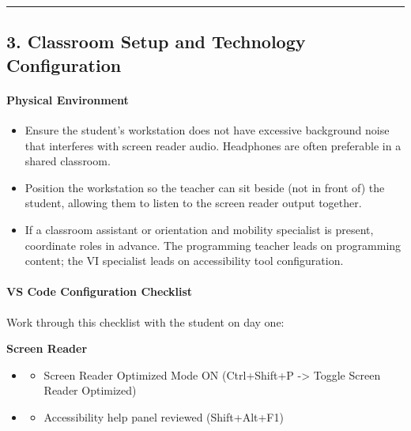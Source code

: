 \documentclass[
  justified,
  openright,
]{tufte-book}
\let\subsubsection\paragraph
\let\paragraph\paragraph
\let\subsubsection\paragraph
\let\paragraph\paragraph
\providecommand{\tightlist}{%
  \setlength{\itemsep}{0pt}\setlength{\parskip}{0pt}}
\begin{document}
\begin{center}\rule{0.5\linewidth}{0.5pt}\end{center}

\subsection{3. Classroom Setup and Technology
Configuration}\label{classroom-setup-and-technology-configuration}

\subsubsection{Physical Environment}\label{physical-environment}

\begin{itemize}
\tightlist
\item
  Ensure the student's workstation does not have excessive background
  noise that interferes with screen reader audio. Headphones are often
  preferable in a shared classroom.
\item
  Position the workstation so the teacher can sit beside (not in front
  of) the student, allowing them to listen to the screen reader output
  together.
\item
  If a classroom assistant or orientation and mobility specialist is
  present, coordinate roles in advance. The programming teacher leads on
  programming content; the VI specialist leads on accessibility tool
  configuration.
\end{itemize}

\subsubsection{VS Code Configuration
Checklist}\label{vs-code-configuration-checklist}

Work through this checklist with the student on day one:

\textbf{Screen Reader}

\begin{itemize}
\tightlist
\item
  \begin{itemize}
  \tightlist
  \item[$\square$]
    Screen Reader Optimized Mode ON (Ctrl+Shift+P -\textgreater{} Toggle
    Screen Reader Optimized)
  \end{itemize}
\item
  \begin{itemize}
  \tightlist
  \item[$\square$]
    Accessibility help panel reviewed (Shift+Alt+F1)
  \end{itemize}
\end{itemize}
\end{document}
